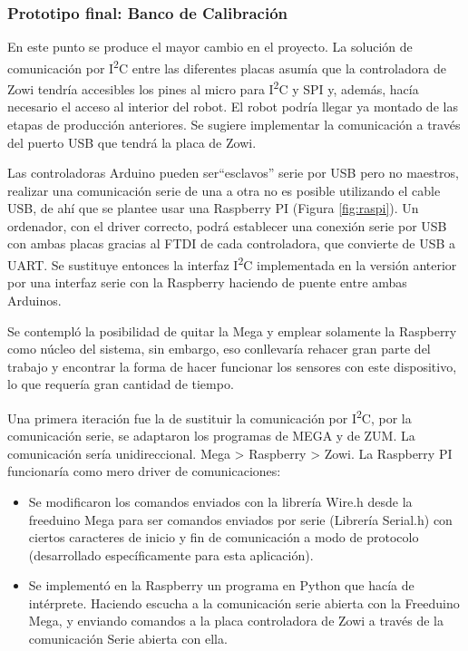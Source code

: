 \subsubsection{Prototipo final: Banco de Calibración}

En este punto se produce el mayor cambio en el proyecto. La solución de comunicación por I\textsuperscript{2}C entre las diferentes placas asumía que la controladora de Zowi tendría accesibles los pines al micro para I\textsuperscript{2}C y SPI y, además, hacía necesario el acceso al interior del robot. El robot podría llegar ya montado de las etapas de producción anteriores. Se sugiere implementar la comunicación a través del puerto USB que tendrá la placa de Zowi.

Las controladoras Arduino pueden ser``esclavos'' serie por USB pero no maestros, realizar una comunicación serie de una a otra no es posible utilizando el cable USB, de ahí que se plantee usar una Raspberry PI (Figura \ref{fig:raspi}). Un ordenador, con el driver correcto, podrá establecer una conexión serie por USB con ambas placas gracias al FTDI de cada controladora, que convierte de USB a UART. Se sustituye entonces la interfaz I\textsuperscript{2}C implementada en la versión anterior por una interfaz serie con la Raspberry haciendo de puente entre ambas Arduinos.

Se contempló la posibilidad de quitar la Mega y emplear solamente la Raspberry como núcleo del sistema, sin embargo, eso conllevaría rehacer gran parte del trabajo y encontrar la forma de hacer funcionar los sensores con este dispositivo, lo que requería gran cantidad de tiempo.

Una primera iteración fue la de sustituir la comunicación por I\textsuperscript{2}C, por la comunicación serie, se adaptaron los programas de MEGA y de ZUM. La comunicación sería unidireccional. Mega > Raspberry > Zowi. La Raspberry PI funcionaría como mero driver de comunicaciones:
\begin{itemize}
  \item Se modificaron los comandos enviados con la librería Wire.h desde la freeduino Mega para ser comandos enviados por serie (Librería Serial.h) con ciertos caracteres de inicio y fin de comunicación a modo de protocolo (desarrollado específicamente para esta aplicación).
  \item Se implementó en la Raspberry un programa en Python que hacía de intérprete. Haciendo escucha a la comunicación serie abierta con la Freeduino Mega, y enviando comandos a la placa controladora de Zowi a través de la comunicación Serie abierta con ella.
\end{itemize}

